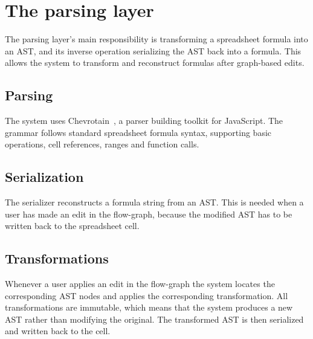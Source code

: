 \section{The parsing layer}
The parsing layer's main responsibility is transforming a spreadsheet formula into an AST, and its inverse operation serializing the AST back into a formula. This allows the system to transform and reconstruct formulas after graph-based edits.
\subsection{Parsing}
The system uses Chevrotain~\cite{chevrotain}, a parser building toolkit for JavaScript. The grammar follows standard spreadsheet formula syntax, supporting basic operations, cell references, ranges and function calls.
\subsection{Serialization}
The serializer reconstructs a formula string from an AST. This is needed when a user has made an edit in the flow-graph, because the modified AST has to be written back to the spreadsheet cell.
\subsection{Transformations}
Whenever a user applies an edit in the flow-graph the system locates the corresponding AST nodes and applies the corresponding transformation. All transformations are immutable, which means that the system produces a new AST rather than modifying the original. The transformed AST is then serialized and written back to the cell.
